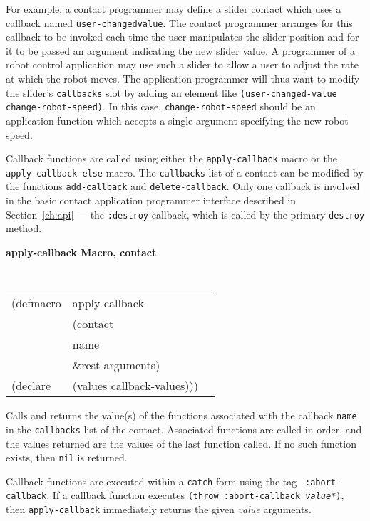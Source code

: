 \documentclass[twoside]{book}
\begin{document}
\begin{sloppy}
For example, a contact programmer may define a slider contact which uses a
callback named {\tt user-changed\-value}. The contact programmer arranges for
this callback to be invoked each time the user manipulates the slider position
and for it to be passed an argument indicating the new slider value. A
programmer of a robot control application may use such a slider to
allow a user to adjust the rate at which the robot moves. The application
programmer will thus want to modify the slider's {\tt callbacks} slot by adding
an element like {\tt (user-changed-value change-robot-speed)}. In this case,
{\tt change-robot-speed} should be an application function which accepts a
single argument specifying the new robot speed.

Callback functions are called using either the {\tt apply-callback}
macro or the {\tt apply-callback-else} macro. The {\tt callbacks} list
of a contact can be modified by the functions {\tt add-callback} and
{\tt delete-callback}. Only one callback is involved in the basic
contact application programmer interface described in
Section~\ref{ch:api} --- the {\tt :destroy} callback, which is called by
the primary {\tt destroy} method.

{\samepage
{\large {\bf apply-callback \hfill Macro, contact}} 

\begin{flushright} \parbox[t]{6.125in}{
\tt
\begin{tabular}{lll}
\raggedright
(defmacro & apply-callback & \\ 
& (contact\\
&  name\\
& \&rest arguments)\\
(declare &(values callback-values)))
\end{tabular}
\rm

}\end{flushright}
}

\begin{flushright} 
\parbox[t]{6.125in}{
Calls and returns the value(s) of the functions associated with the callback
{\tt name} in the
{\tt callbacks} list of the contact. Associated functions are called in order,
and the values returned are the values of the last function called. If no such
function exists, then {\tt nil} is returned.} 

\parbox[t]{6.125in}{
Callback functions are executed within a {\tt catch} form using the tag {\tt
:abort-callback}. If a callback function executes {\tt (throw :abort-callback
{\em value*})}, then {\tt apply-callback} immediately returns the given {\em
value} arguments.
}


\end{flushright}
\end{sloppy}
\end{document}
